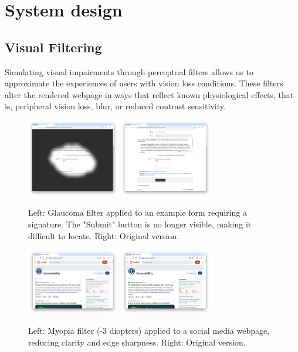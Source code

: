 
\section{System design}
\subsection{Visual Filtering}

Simulating visual impairments through perceptual filters allows us to approximate the experiences of users with vision loss conditions. These filters alter the rendered webpage in ways that reflect known physiological effects, that is, peripheral vision loss, blur, or reduced contrast sensitivity.

\begin{figure}
    \centering
    \includegraphics[width=115pt]{imgs/glaucoma-filter.png}
    \includegraphics[width=115pt]{imgs/no-glaucoma-filter.png}
    \caption{Left: Glaucoma filter applied to an example form requiring a signature. The "Submit" button is no longer visible, making it difficult to locate. Right: Original version.}
    \vspace{-13pt}
    \label{fig:glaucoma-filters}
\end{figure}

\begin{figure}
    \centering
    \includegraphics[width=115pt]{imgs/myopia-filter.png}
    \includegraphics[width=115pt]{imgs/no-myopia-filter.png}
    \caption{Left: Myopia filter (-3 diopters) applied to a social media webpage, reducing clarity and edge sharpness. Right: Original version.}
    \vspace{-13pt}
    \label{fig:myopia-filters}
\end{figure}

